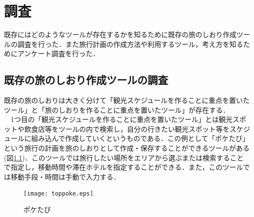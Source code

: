 \documentclass{funthesis}
\begin{document}






\chapter{調査}%

既存にはどのようなツールが存在するかを知るために既存の旅のしおり作成ツールの調査を行った．また旅行計画の作成方法や利用するツール，考え方を知るためにアンケート調査を行った．


\section{既存の旅のしおり作成ツールの調査}

既存の旅のしおりは大きく分けて「観光スケジュールを作ることに重点を置いたツール」と「旅のしおりを作ることに重点を置いたツール」が存在する．\\
　1つ目の「観光スケジュールを作ることに重点を置いたツール」とは観光スポットや飲食店等をツールの内で検索し，自分の行きたい観光スポット等をスケジュールに組み込んで作成していくというものである．この例として「ポケたび」\cite{poketrip}という旅行の計画を旅のしおりとして作成・保存することができるツールがある(図\ref{Ltoppoke})．このツールでは旅行したい場所をエリアから選ぶまたは検索することで指定し，移動時間や滞在ホテルを指定することができる．また，このツールでは移動手段・時間は手動で入力する．

\begin{figure}[htpb]
\begin{center}
\texttt{[image: toppoke.eps]}
\end{center}
\caption{ポケたび}
\label{Ltoppoke}
\end{figure}
\end{document}

